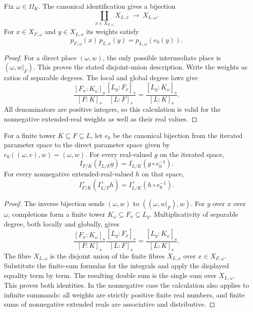 \begin{lemma}
\label{lem:finite-tower-weights}
\leanok
{}
Fix $\omega\in\Omega_K$. The canonical identification gives a bijection
\[
 \coprod_{x\in X_{F,\omega}}X_{L,x}\ \longrightarrow\ X_{L,\omega}.
\]
For $x\in X_{F,\omega}$ and $y\in X_{L,x}$ its weights satisfy
\[
 p_{F,\omega}(x)\,p_{L,x}(y)=p_{L,\omega}(e_0(y)).
\]
\end{lemma}
\begin{proof}
For a direct place $(\omega,w)$, the only possible intermediate
place is $(\omega,w|_F)$. This proves the stated disjoint-union
description. Write the weights as ratios of separable degrees.
The local and global degree laws give
\[
 \frac{[F_x:K_\omega]_s}{[F:K]_s}
 \frac{[L_y:F_x]_s}{[L:F]_s}
 =
 \frac{[L_y:K_\omega]_s}{[L:K]_s}.
\]
All denominators are positive integers, so this calculation is valid
for the nonnegative extended-real weights as well as their real values.
\end{proof}

\begin{lemma}
\label{lem:finite-fibre-tower}
\leanok
{}
For a finite tower $K\subseteq F\subseteq L$, let $e_0$ be the
canonical bijection from the iterated parameter space to the direct
parameter space given by
$e_0((\omega,v),w)=(\omega,w)$. For every real-valued $g$ on the
iterated space,
\[
 I_{F/K}(I_{L/F}g)=I_{L/K}(g\circ e_0^{-1}).
\]
For every nonnegative extended-real-valued $h$ on that space,
\[
 I^+_{F/K}(I^+_{L/F}h)=I^+_{L/K}(h\circ e_0^{-1}).
\]
\end{lemma}
\begin{proof}
The inverse bijection sends $(\omega,w)$ to
$((\omega,w|_F),w)$. For $y$ over $x$ over $\omega$, completions
form a finite tower $K_\omega\subseteq F_x\subseteq L_y$.
Multiplicativity of separable degree, both locally and globally, gives
\[
 \frac{[F_x:K_\omega]_s}{[F:K]_s}
 \frac{[L_y:F_x]_s}{[L:F]_s}
 =\frac{[L_y:K_\omega]_s}{[L:K]_s}.
\]
The fibre $X_{L,\omega}$ is the disjoint union of the finite fibres
$X_{L,x}$ over $x\in X_{F,\omega}$. Substitute the finite-sum
formulas for the integrals and apply the displayed equality term by
term. The resulting double sum is the single sum over
$X_{L,\omega}$. This proves both identities. In the nonnegative
case the calculation also applies to infinite summands: all weights
are strictly positive finite real numbers, and finite sums of
nonnegative extended reals are associative and distributive.
\end{proof}

